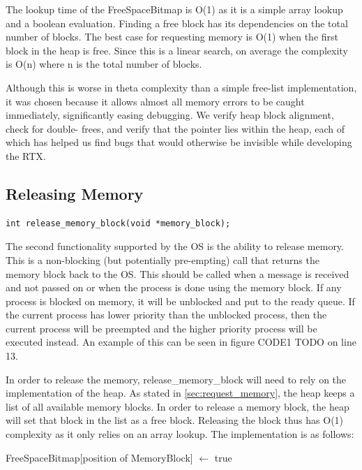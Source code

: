 \documentclass[12pt,twocolumn]{report}
\begin{document}
The lookup time of the FreeSpaceBitmap is O(1) as it is a simple array lookup and a boolean evaluation. Finding a free block has its dependencies on the total number of blocks. The best case for requesting memory is O(1) when the first block in the heap is free. Since this is a linear search, on average the complexity is O(n) where n is the total number of blocks.

Although this is worse in theta complexity than a simple free-list implementation,
it was chosen because it allows almost all memory errors to be caught immediately,
significantly easing debugging. We verify heap block alignment, check for double-
frees, and verify that the pointer lies within the heap, each of which has helped
us find bugs that would otherwise be invisible while developing the RTX.

\bigskip

\subsection{Releasing Memory}
\begin{lstlisting}
int release_memory_block(void *memory_block);
\end{lstlisting}

\par The second functionality supported by the OS is the ability to release memory. This is a non-blocking (but potentially pre-empting) call that returns the memory block back to the OS. This should be called when a message is received and not passed on or when the process is done using the memory block. If any process is blocked on memory, it will be unblocked and put to the ready queue. If the current process has lower priority than the unblocked process, then the current process will be preempted and the higher priority process will be executed instead. An example of this can be seen in figure CODE1 TODO on line 13.

\par In order to release the memory, release\_memory\_block will need to rely on the implementation of the heap. As stated in \ref{sec:request_memory}, the heap keeps a list of all available memory blocks. In order to release a memory block, the heap will set that block in the list as a free block. Releasing the block thus has O(1) complexity as it only relies on an array lookup. The implementation is as follows:
\begin{algorithmic}
    \State FreeSpaceBitmap[position of MemoryBlock] $\gets$ true
  \EndFunction
\end{algorithmic}
\end{document}
